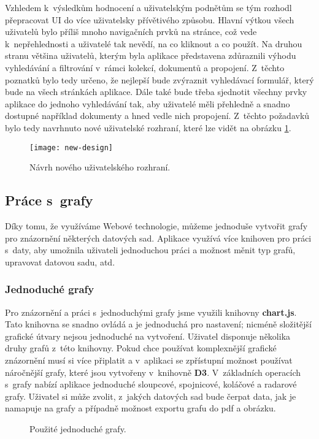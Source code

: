 \par Vzhledem k~výsledkům hodnocení a uživatelským podnětům se tým rozhodl přepracovat UI do více uživatelsky přívětivého způsobu. Hlavní výtkou všech uživatelů bylo příliš mnoho navigačních prvků na stránce, což vede k~nepřehlednosti a uživatelé tak nevědí, na co kliknout a co použít. Na druhou stranu většina uživatelů, kterým byla aplikace představena zdůraznili výhodu vyhledávání a filtrování v~rámci kolekcí, dokumentů a propojení. Z~těchto poznatků bylo tedy určeno, že nejlepší bude zvýraznit vyhledávací formulář, který bude na všech stránkách aplikace. Dále také bude třeba sjednotit všechny prvky aplikace do jednoho vyhledávání tak, aby uživatelé měli přehledně a snadno dostupné například dokumenty a hned vedle nich propojení. Z~těchto požadavků bylo tedy navrhnuto nové uživatelské rozhraní, které lze vidět na obrázku \ref{new-ui}.

\begin{figure}[htp]
\centering
\texttt{[image: new-design]}
\caption{Návrh nového uživatelského rozhraní.}
\label{new-ui}
\end{figure}

\subsection{Práce s~grafy}
\par Díky tomu, že využíváme Webové technologie, můžeme jednoduše vytvořit grafy pro znázornění některých datových sad. Aplikace využívá více knihoven pro práci s~daty, aby umožnila uživateli jednoduchou práci a možnost měnit typ grafů, upravovat datovou sadu, atd.

\subsubsection{Jednoduché grafy}
\par Pro znázornění a práci s~jednoduchými grafy jsme využili knihovny \textbf{chart.js}. Tato knihovna se snadno ovládá a je jednoduchá pro nastavení; nicméně složitější grafické útvary nejsou jednoduché na vytvoření. Uživatel disponuje několika druhy grafů z~této knihovny. Pokud chce používat komplexnější grafické znázornění musí si více připlatit a v~aplikaci se zpřístupní možnost používat náročnější grafy, které jsou vytvořeny v~knihovně \textbf{D3}. V~základních operacích s~grafy nabízí aplikace jednoduché sloupcové, spojnicové, koláčové a radarové grafy. Uživatel si může zvolit, z~jakých datových sad bude čerpat data, jak je namapuje na grafy a případně možnost exportu grafu do pdf a obrázku.
\begin{figure}[!htb]
\centering
{}%
%
%
\caption{Použité jednoduché grafy.}%
\label{fig:example}%
\end{figure}

